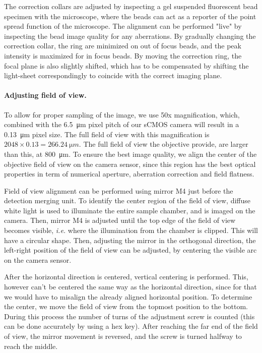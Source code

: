 The correction collars are adjusted by inspecting a gel suspended fluorescent bead specimen with the microscope, where the beads can act as a reporter of the point spread function of the microscope. The alignment can be performed "live" by inspecting the bead image quality for any aberrations. By gradually changing the correction collar, the ring are minimized on out of focus beads, and the peak intensity is maximized for in focus beads. By moving the correction ring, the focal plane is also slightly shifted, which has to be compensated by shifting the light-sheet correspondingly to coincide with the correct imaging plane.

\paragraph{Adjusting field of view.}
To allow for proper sampling of the image, we use 50x magnification, which, combined with the \SI{6.5}{\micro m} pixel pitch of our sCMOS camera will result in a \SI{0.13}{\micro m} pixel size. The full field of view with this magnification is $2048 \times 0.13 = \SI{266.24}{\micro m}$. The full field of view the objective provide, are larger than this, at \SI{800}{\micro m}. To ensure the best image quality, we align the center of the objective field of view on the camera sensor, since this region has the best optical properties in term of numerical aperture, aberration correction and field flatness.

Field of view alignment can be performed using mirror M4 just before the detection merging unit. To identify the center region of the field of view, diffuse white light is used to illuminate the entire sample chamber, and is imaged on the camera. Then, mirror M4 is adjusted until the top edge of the field of view becomes visible, \textit{i.e.} where the illumination from the chamber is clipped. This will have a circular shape. Then, adjusting the mirror in the orthogonal direction, the left-right position of the field of view can be adjusted, by centering the visible arc on the camera sensor.

After the horizontal direction is centered, vertical centering is performed. This, however can't be centered the same way as the horizontal direction, since for that we would have to misalign the already aligned horizontal position. To determine the center, we move the field of view from the topmost position to the bottom. During this process the number of  turns of the adjustment screw is counted (this can be done accurately by using a hex key). After reaching the far end of the field of view, the mirror movement is reversed, and the screw is turned halfway to reach the middle.

